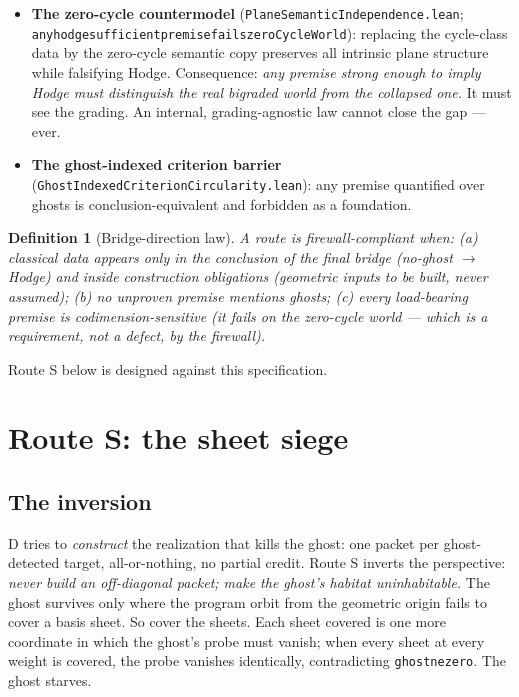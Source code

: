 \documentclass[11pt]{article}
\renewcommand{\_}{\textunderscore\allowbreak}
\newtheorem{definition}{Definition}[section]
\begin{document}
\begin{itemize}[leftmargin=2em]
\item \textbf{The zero-cycle countermodel}
(\texttt{PlaneSemanticIndependence.lean};
\texttt{any\_hodge\_sufficient\_premise\_fails\_zeroCycleWorld}): replacing the
cycle-class data by the zero-cycle semantic copy preserves all intrinsic plane
structure while falsifying Hodge. Consequence: \emph{any premise strong enough
to imply Hodge must distinguish the real bigraded world from the collapsed
one.} It must see the grading. An internal, grading-agnostic law cannot close
the gap --- ever.
\item \textbf{The ghost-indexed criterion barrier}
(\texttt{GhostIndexedCriterionCircularity.lean}): any premise quantified over
ghosts is conclusion-equivalent and forbidden as a foundation.
\end{itemize}

\begin{definition}[Bridge-direction law]\label{def:bridge}
A route is \emph{firewall-compliant} when:
(a) classical data appears only in the \emph{conclusion} of the final bridge
(no-ghost $\to$ Hodge) and inside \emph{construction obligations} (geometric
inputs to be built, never assumed);
(b) no unproven premise mentions ghosts;
(c) every load-bearing premise is codimension-sensitive (it fails on the
zero-cycle world --- which is a \emph{requirement}, not a defect, by the
firewall).
\end{definition}

Route S below is designed against this specification.

\section{Route S: the sheet siege}\label{sec:routeS}

\subsection{The inversion}

D tries to \emph{construct} the realization that kills the ghost: one packet
per ghost-detected target, all-or-nothing, no partial credit. Route S inverts
the perspective: \emph{never build an off-diagonal packet; make the ghost's
habitat uninhabitable.} The ghost survives only where the program orbit from
the geometric origin fails to cover a basis sheet. So cover the sheets. Each
sheet covered is one more coordinate in which the ghost's probe must vanish;
when every sheet at every weight is covered, the probe vanishes identically,
contradicting \texttt{ghost\_ne\_zero}. The ghost starves.
\end{document}
